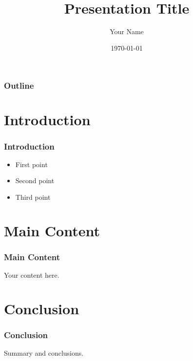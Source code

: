 \documentclass{beamer}
\title{Presentation Title}
\author{Your Name}
\institute{Your Institution}
\date{\today}
\begin{document}
\frame{\titlepage}

\begin{frame}
\frametitle{Outline}
\tableofcontents
\end{frame}

\section{Introduction}

\begin{frame}
\frametitle{Introduction}
\begin{itemize}
    \item First point
    \item Second point
    \item Third point
\end{itemize}
\end{frame}

\section{Main Content}

\begin{frame}
\frametitle{Main Content}
Your content here.
\end{frame}

\section{Conclusion}

\begin{frame}
\frametitle{Conclusion}
Summary and conclusions.
\end{frame}
\end{document}
